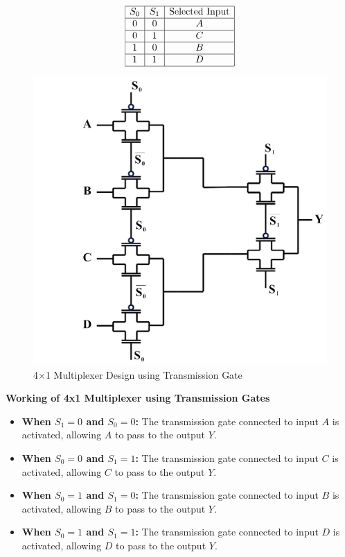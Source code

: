 \documentclass[a4paper,12pt]{article}
\begin{document}
	\[
	\begin{array}{|c|c|c|}
		\hline
		S_0 & S_1 & \text{Selected Input} \\ \hline
		0   & 0   & A \\ \hline
		0   & 1   & C \\ \hline
		1   & 0   & B \\ \hline
		1   & 1   & D \\ \hline
	\end{array}
	\]
	\begin{figure}[H]
		\centering
		\includegraphics[width=0.7\linewidth]{Images/041}
			\caption{4$\times$1 Multiplexer Design using Transmission Gate}
		\label{fig:1}
	\end{figure}
\textbf{Working of 4x1 Multiplexer using Transmission Gates}
	\begin{itemize}
		\item \textbf{When \(S_1 = 0\) and \(S_0 = 0\):} The transmission gate connected to input \(A\) is activated, allowing \(A\) to pass to the output \(Y\).
		\item \textbf{When \(S_0 = 0\) and \(S_1 = 1\):} The transmission gate connected to input \(C\) is activated, allowing \(C\) to pass to the output \(Y\).
		\item \textbf{When \(S_0 = 1\) and \(S_1 = 0\):} The transmission gate connected to input \(B\) is activated, allowing \(B\) to pass to the output \(Y\).
		\item \textbf{When \(S_0 = 1\) and \(S_1 = 1\):} The transmission gate connected to input \(D\) is activated, allowing \(D\) to pass to the output \(Y\).
	\end{itemize}
	
\end{document}
